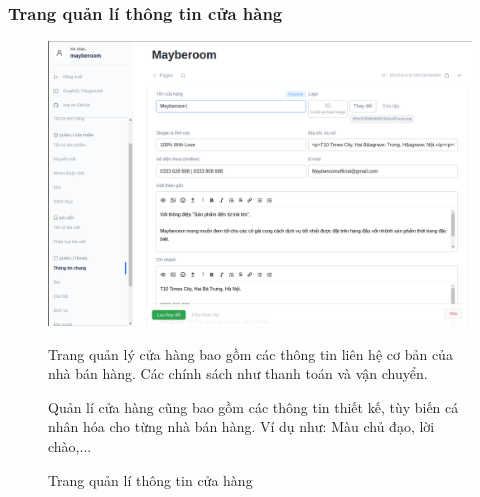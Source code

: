 \subsubsection{Trang quản lí thông tin cửa hàng}
\FloatBarrier
\begin{figure}[!htbp]\fontsize{13px}{13px}\selectfont
\centering
		\includegraphics[width=\textwidth]{./results/store}
		\caption{Trang quản lí thông tin cửa hàng}
\justifying
Trang quản lý cửa hàng bao gồm các thông tin liên hệ cơ bản của nhà bán hàng. Các chính sách như thanh toán và vận chuyển.

Quản lí cửa hàng cũng bao gồm các thông tin thiết kế, tùy biến cá nhân hóa cho từng nhà bán hàng. Ví dụ như: Màu chủ đạo, lời chào,...
\end{figure}
\clearpage
